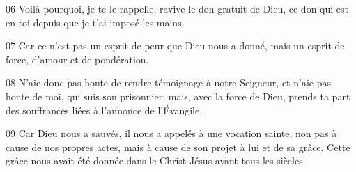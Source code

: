 
06 Voilà pourquoi, je te le rappelle, ravive le don gratuit de Dieu, ce don qui est en toi depuis que je t’ai imposé les mains.

07 Car ce n’est pas un esprit de peur que Dieu nous a donné, mais un esprit de force, d’amour et de pondération.

08 N’aie donc pas honte de rendre témoignage à notre Seigneur, et n’aie pas honte de moi, qui suis son prisonnier; mais, avec la force de Dieu, prends ta part des souffrances liées à l’annonce de l’Évangile.

09 Car Dieu nous a sauvés, il nous a appelés à une vocation sainte, non pas à cause de nos propres actes, mais à cause de son projet à lui et de sa grâce. Cette grâce nous avait été donnée dans le Christ Jésus avant tous les siècles.